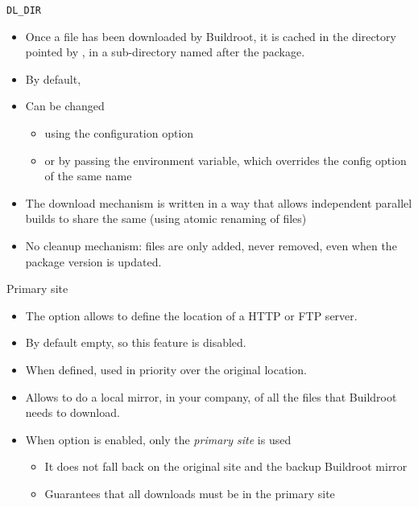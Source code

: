 \begin{frame}{{\tt DL\_DIR}}
  \begin{itemize}
  \item Once a file has been downloaded by Buildroot, it is cached in
    the directory pointed by
    , in a sub-directory named after the package.
  \item By default, 
  \item Can be changed
    \begin{itemize}
    \item using the  configuration option
    \item or by passing the  environment variable,
      which overrides the config option of the same name
    \end{itemize}
  \item The download mechanism is written in a way that allows
    independent parallel builds to share the same  (using
    atomic renaming of files)
  \item No cleanup mechanism: files are only added, never removed,
    even when the package version is updated.
  \end{itemize}
\end{frame}

\begin{frame}{Primary site}
  \begin{itemize}
  \item The  option allows to define the
    location of a HTTP or FTP server.
  \item By default empty, so this feature is disabled.
  \item When defined, used in priority over the original location.
  \item Allows to do a local mirror, in your company, of all the files
    that Buildroot needs to download.
  \item When option  is enabled, only the
    {\em primary site} is used
    \begin{itemize}
    \item It does not fall back on the original site and the backup
      Buildroot mirror
    \item Guarantees that all downloads must be in the primary site
    \end{itemize}
  \end{itemize}
\end{frame}


